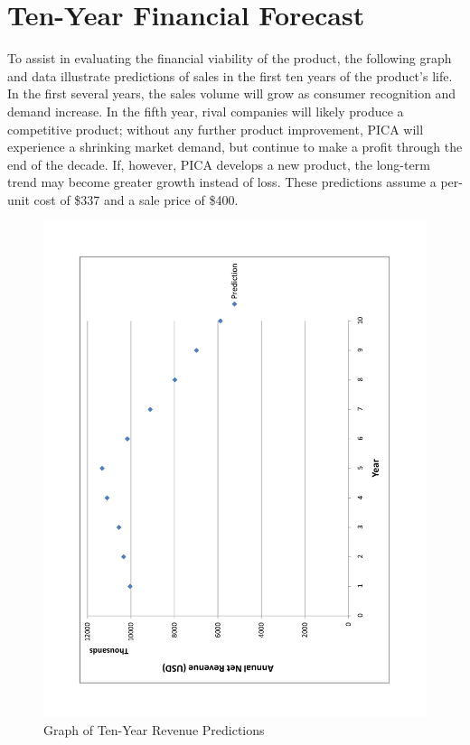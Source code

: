 \section{Ten-Year Financial Forecast}

To assist in evaluating the financial viability of the product, the following graph and data illustrate predictions of sales in the first ten years of the product's life. In the first several years, the sales volume will grow as consumer recognition and demand increase. In the fifth year, rival companies will likely produce a competitive product; without any further product improvement, PICA will experience a shrinking market demand, but continue to make a profit through the end of the decade. If, however, PICA develops a new product, the long-term trend may become greater growth instead of loss. These predictions assume a per-unit cost of \$337 and a sale price of \$400.


\begin{figure}[htbp]
 \begin{center}
  \includegraphics[angle=-90,width=5.5in]{figures/DecadeForecast}
 \end{center}
 \caption{Graph of Ten-Year Revenue Predictions}
\end{figure}

